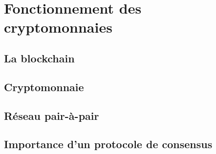 \documentclass[../tb_report.tex]{subfiles}
\begin{document}
  
\chapter{Fonctionnement des cryptomonnaies}

\label{ch:presentation}

\section{La blockchain}

\section{Cryptomonnaie}

\section{Réseau pair-à-pair}

\section{Importance d'un protocole de consensus}
\end{document}
